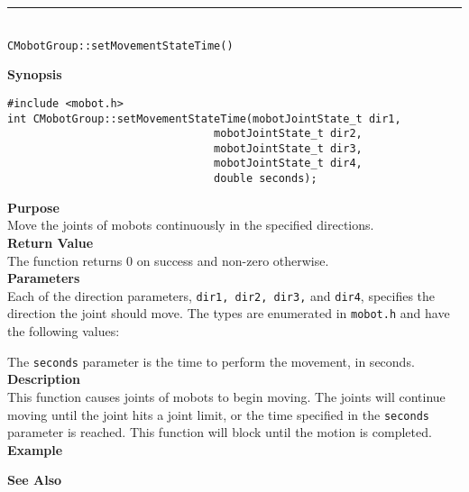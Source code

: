 \noindent
\vspace{5pt}
\rule{4.5in}{0.015in}\\
\noindent
{\LARGE \texttt{CMobotGroup::setMovementStateTime()}}\\
{}

\noindent
{\bf Synopsis}
\vspace{-8pt}
\begin{verbatim}
#include <mobot.h>
int CMobotGroup::setMovementStateTime(mobotJointState_t dir1, 
                                mobotJointState_t dir2, 
                                mobotJointState_t dir3, 
                                mobotJointState_t dir4, 
                                double seconds);
\end{verbatim}

\noindent
{\bf Purpose}\\
Move the joints of mobots continuously in the specified directions.\\

\noindent
{\bf Return Value}\\
The function returns 0 on success and non-zero otherwise.\\

\noindent
{\bf Parameters}\\
Each of the direction parameters, \texttt{dir1, dir2, dir3,} and \texttt{dir4}, specifies the direction the joint should move. The types
are enumerated in \texttt{mobot.h} and have the following values:

The \texttt{seconds} parameter is the time to perform the movement, in seconds.
\\

\noindent
{\bf Description}\\
This function causes joints of mobots to begin moving. The joints will continue moving
until the joint hits a joint limit, or the time specified in the \texttt{seconds} parameter
is reached. This function will block until the motion is completed.\\

\noindent
{\bf Example}\\
\noindent

\noindent
{\bf See Also}\\

